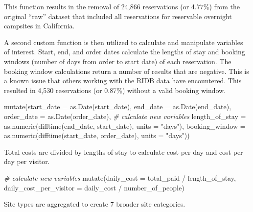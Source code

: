 \documentclass[
]{book}
\newenvironment{Shaded}{\begin{snugshade}}{\end{snugshade}}
\newcommand{\AttributeTok}[1]{\textcolor[rgb]{0.77,0.63,0.00}{#1}}
\newcommand{\CommentTok}[1]{\textcolor[rgb]{0.56,0.35,0.01}{\textit{#1}}}
\newcommand{\FunctionTok}[1]{\textcolor[rgb]{0.00,0.00,0.00}{#1}}
\newcommand{\NormalTok}[1]{#1}
\newcommand{\SpecialCharTok}[1]{\textcolor[rgb]{0.00,0.00,0.00}{#1}}
\newcommand{\StringTok}[1]{\textcolor[rgb]{0.31,0.60,0.02}{#1}}
\begin{document}
This function results in the removal of 24,866 reservations (or 4.77\%) from the original ``raw'' dataset that included all reservations for reservable overnight campsites in California.

A second custom function is then utilized to calculate and manipulate variables of interest. Start, end, and order dates calculate the lengths of stay and booking windows (number of days from order to start date) of each reservation. The booking window calculations return a number of results that are negative. This is a known issue that others working with the RIDB data have encountered. This resulted in 4,530 reservations (or 0.87\%) without a valid booking window.

\begin{Shaded}
\begin{Highlighting}[]
\FunctionTok{mutate}\NormalTok{(}\AttributeTok{start\_date =} \FunctionTok{as.Date}\NormalTok{(start\_date),}
       \AttributeTok{end\_date =} \FunctionTok{as.Date}\NormalTok{(end\_date),}
       \AttributeTok{order\_date =} \FunctionTok{as.Date}\NormalTok{(order\_date),}
       \CommentTok{\# calculate new variables}
       \AttributeTok{length\_of\_stay =} \FunctionTok{as.numeric}\NormalTok{(}\FunctionTok{difftime}\NormalTok{(end\_date, start\_date), }
                                   \AttributeTok{units =} \StringTok{"days"}\NormalTok{),}
       \AttributeTok{booking\_window =} \FunctionTok{as.numeric}\NormalTok{(}\FunctionTok{difftime}\NormalTok{(start\_date, order\_date), }
                                   \AttributeTok{units =} \StringTok{"days"}\NormalTok{))}
\end{Highlighting}
\end{Shaded}

Total costs are divided by lengths of stay to calculate cost per day and cost per day per visitor.

\begin{Shaded}
\begin{Highlighting}[]
\CommentTok{\# calculate new variables}
\FunctionTok{mutate}\NormalTok{(}\AttributeTok{daily\_cost =}\NormalTok{ total\_paid }\SpecialCharTok{/}\NormalTok{ length\_of\_stay,}
       \AttributeTok{daily\_cost\_per\_visitor =}\NormalTok{ daily\_cost }\SpecialCharTok{/}\NormalTok{ number\_of\_people)}
\end{Highlighting}
\end{Shaded}

Site types are aggregated to create 7 broader site categories.
\end{document}
